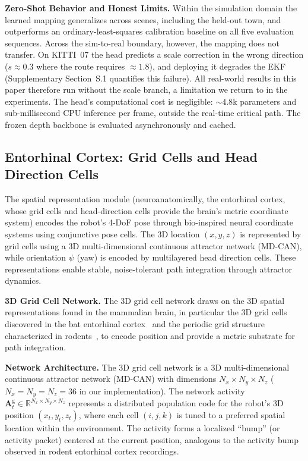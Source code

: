 \textbf{Zero-Shot Behavior and Honest Limits.} Within the simulation domain the learned mapping generalizes across scenes, including the held-out town, and outperforms an ordinary-least-squares calibration baseline on all five evaluation sequences. Across the sim-to-real boundary, however, the mapping does not transfer. On KITTI~07 the head predicts a scale correction in the wrong direction ($s\approx0.3$ where the route requires $\approx1.8$), and deploying it degrades the EKF (Supplementary Section~S.1 quantifies this failure). All real-world results in this paper therefore run without the scale branch, a limitation we return to in the experiments. The head's computational cost is negligible: ${\sim}4.8$k parameters and sub-millisecond CPU inference per frame, outside the real-time critical path. The frozen depth backbone is evaluated asynchronously and cached.

\subsection{Entorhinal Cortex: Grid Cells and Head Direction Cells}
\label{sec:grid_cells}

The spatial representation module (neuroanatomically, the entorhinal cortex, whose grid cells and head-direction cells provide the brain's metric coordinate system) encodes the robot's 4-DoF pose through bio-inspired neural coordinate systems using conjunctive pose cells. The 3D location $(x, y, z)$ is represented by grid cells using a 3D multi-dimensional continuous attractor network (MD-CAN), while orientation $\psi$ (yaw) is encoded by multilayered head direction cells. These representations enable stable, noise-tolerant path integration through attractor dynamics.

\textbf{3D Grid Cell Network.} The 3D grid cell network draws on the 3D spatial representations found in the mammalian brain, in particular the 3D grid cells discovered in the bat entorhinal cortex~\cite{finkelstein2016three} and the periodic grid structure characterized in rodents~\cite{hafting2005microstructure}, to encode position and provide a metric substrate for path integration.

\textbf{Network Architecture.} The 3D grid cell network is a 3D multi-dimensional continuous attractor network (MD-CAN) with dimensions $N_x \times N_y \times N_z$ ($N_x = N_y = N_z = 36$ in our implementation). The network activity $\mathbf{A}^\mathrm{g}_t \in \mathbb{R}^{N_x \times N_y \times N_z}$ represents a distributed population code for the robot's 3D position $(x_t, y_t, z_t)$, where each cell $(i,j,k)$ is tuned to a preferred spatial location within the environment. The activity forms a localized ``bump'' (or activity packet) centered at the current position, analogous to the activity bump observed in rodent entorhinal cortex recordings.

